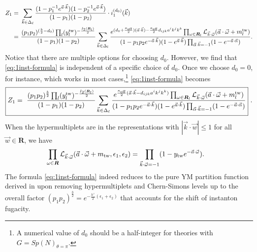 \documentclass[letterpaper, 11pt]{article}
\newcommand{\nn}{\nonumber}
\def\CL{{\cal L}}
\def\e{\epsilon}
\def\w{\omega}
\begin{document}
\begin{align}
  \label{eq:1inst-formula}
  Z_1=&\ \sum_{\vec{k}\in\Delta_\ell}\frac{(1-p_1^{-1}e^{\vec{a}\cdot\vec{k}})(1-p_2^{-1}e^{\vec{a}\cdot\vec{k}})}{(1-p_1)(1-p_2)}
  \cdot i_1^{(d_0)}(\vec{k}) 
   \\=&\ \frac{(p_1p_2)^{(\frac{b}{2}-d_0)}\prod_{l}(y_{l}^{\text{tw}})^{-{\frac{I_2(\boldsymbol{R}_l)}{2}}}}{(1-p_1)(1-p_2)} \sum_{\vec{k}\in\Delta_l}\frac{e^{(d_0+\frac{\kappa_{\text{eff}}}{2})(\vec{a}\cdot\vec{k})-\frac{\kappa_{\text{eff}}}{2}d_{ijk}a^ik^jk^k}\prod_{\w \in \boldsymbol{R}_l} \CL_{\vec{k}\cdot\vec{\w}}(\vec{a}\cdot \vec{\w} + m_{l}^\text{tw})}{(1-p_1p_2e^{-\vec{a}\cdot\vec{k}})(1-e^{\vec{a}\cdot\vec{k}})\prod_{\vec{\alpha}\cdot \vec{k}=-1}(1-e^{-\vec{a}\cdot\vec{\alpha}})} . \nn
\end{align}
Notice that there are multiple options for choosing $d_0$. However, we find that \eqref{eq:1inst-formula} is independent of a specific choice of $d_0$. Once we choose $d_0 = 0$, for instance, which works in most cases,\footnote{A numerical value of $d_0$ should be a half-integer for theories with $G = Sp(N)_{\theta=\pi}$.} \eqref{eq:1inst-formula} becomes
\begin{align}
\boxed{
  Z_1=\ \frac{(p_1p_2)^{\frac{b}{2}}\prod_{l}(y_{l}^{\text{tw}})^{-\frac{I_2(\boldsymbol{R}_l)}{2}}}{(1-p_1)(1-p_2)} \sum_{\vec{k}\in\Delta_\ell}\frac{e^{\frac{\kappa_{\text{eff}}}{2}(\vec{a}\cdot\vec{k}-d_{ijk}a^ik^jk^k)}\prod_{\w \in \boldsymbol{R}_l} \CL_{\vec{k}\cdot\vec{\w}}(\vec{a}\cdot \vec{\w} + m_{l}^\text{tw})}{(1-p_1p_2e^{-\vec{a}\cdot\vec{k}})(1-e^{\vec{a}\cdot\vec{k}})\prod_{\vec{\alpha}\cdot \vec{k}=-1}(1-e^{-\vec{a}\cdot\vec{\alpha}})}}\ .
\end{align} 
When the hypermultiplets are in the representations with $|\vec{k} \cdot \vec{w}|\le 1$ for all $\vec{w} \in \mathbf{R}$, we have
\begin{align}
  \label{eq:weight-expansion-non-sym}
  \prod_{\w \in \boldsymbol{R}} \CL_{\vec{k}\cdot\vec{\w}}(\vec{a}\cdot \vec{\w} + m_{\text{tw}}, \e_1,\e_2)  &=  \prod_{\vec{k}\cdot \vec{\w} = -1}(1-y_\text{tw} e^{-\vec{a}\cdot \vec{\w}}) .
\end{align}
The formula \eqref{eq:1inst-formula} indeed reduces to the pure YM partition function derived in \cite{Keller:2011ek, Keller:2012da} upon removing hypermultiplets and Chern-Simons levels up to the overall factor $(p_1 p_2)^{\frac{b}{2}} = e^{-\frac{h^\vee}{2} (\e_1 + \e_2)}$ that accounts for the shift of instanton fugacity. 
\end{document}
